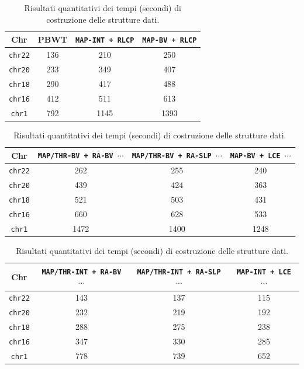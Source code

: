 \begin{table}
  \centering
  \caption{Risultati quantitativi dei tempi (secondi) di costruzione delle
    strutture dati.} 
  \label{tab:maketime}
  \footnotesize
  \begin{tabular}{c||c|c|c} 
    \textbf{Chr}
    & \textbf{PBWT}
    & \textbf{\texttt{MAP-INT + RLCP}}
    & \textbf{\texttt{MAP-BV + RLCP}}\\
    \hline
    \hline
    \texttt{chr22} & 136 & 210 & 250 \\
    \texttt{chr20} & 233 & 349 & 407 \\
    \texttt{chr18} & 290 & 417 & 488 \\
    \texttt{chr16} & 412 & 511 & 613 \\
    \texttt{chr1} & 792 & 1145 & 1393
  \end{tabular}
  \vspace{+3mm}
  \vspace{+1mm}
  \begin{tabular}{c||c|c|c} 
    \textbf{Chr}
    & \textbf{\texttt{MAP/THR-BV + RA-BV $\cdots$}}
    & \textbf{\texttt{MAP/THR-BV + RA-SLP $\cdots$}}
    & \textbf{\texttt{MAP-BV + LCE $\cdots$}}\\
    \hline
    \hline
    \texttt{chr22} & 262 & 255 & 240 \\
    \texttt{chr20} & 439 & 424 & 363 \\
    \texttt{chr18} & 521 & 503 & 431 \\
    \texttt{chr16} & 660 & 628 & 533 \\
    \texttt{chr1} & 1472 & 1400 & 1248 
  \end{tabular}
  \vspace{+3mm}
  \vspace{+1mm}
  \begin{tabular}{c||c|c|c} 
    \textbf{Chr}
    & \textbf{\texttt{MAP/THR-INT + RA-BV $\cdots$}}
    & \textbf{\texttt{MAP/THR-INT + RA-SLP $\cdots$}}
    & \textbf{\texttt{MAP-INT + LCE $\cdots$}}\\
    \hline
    \hline
    \texttt{chr22} & 143 & 137 & 115 \\
    \texttt{chr20} & 232 & 219 & 192 \\
    \texttt{chr18} & 288 & 275 & 238 \\
    \texttt{chr16} & 347 & 330 & 285 \\
    \texttt{chr1} & 778 & 739 & 652
  \end{tabular}
\end{table}
